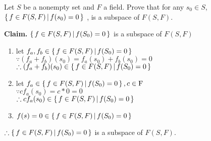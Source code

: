 Let $S$ be a nonempty set and $F$ a field. Prove that for any $s_0 \in S$,$\left\{ \,f \in F(S,F) \, | \, f(s_0) = 0 \,\right\}$ , is a subspace of $F(S,F)$.

\begin{tcolorbox}
	\begin{solution}
		\textbf{Claim.} $\left\{ \,f \in F(S,F)\,|\,f(S_0)=0 \,\right\}$ is a subspace of $F(S,F)$
		\begin{enumerate}
			\item let $f_a,f_b \in \left\{ \,f \in F(S,F)\,|\,f(S_0)=0 \,\right\}$\\
			$\because (f_a+f_b)(s_0) =f_a(s_0) + f_b(s_0) = 0$\\
			$\therefore (f_a + f_b)(s_0) \in \left\{ \,f \in F(S,F)\,|\,f(S_0)=0 \,\right\}$
			\item let $f_a \in \left\{ \,f \in F(S,F)\,|\,f(S_0)=0 \,\right\}, c \in \mathrm{F}$\\
			$\because cf_a(s_0) = c* 0 = 0$\\
			$\therefore cf_a(s_0) \in \left\{ \,f \in F(S,F)\,|\,f(S_0)=0 \,\right\}$
			\item $f(s)=0 \in \left\{ \,f \in F(S,F)\,|\,f(S_0)=0 \,\right\}$
		\end{enumerate}
		$\therefore \left\{ \,f \in F(S,F)\,|\,f(S_0)=0 \,\right\}$ is a subspace of $F(S,F)$.
	\end{solution}
\end{tcolorbox}